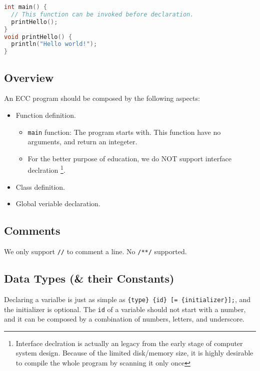 \documentclass{article}
\begin{document}
\begin{lstlisting}[caption=Hello world!\label{code:hw}, language=C]
int main() {
  // This function can be invoked before declaration.
  printHello();
}
void printHello() {
  println("Hello world!");
}
\end{lstlisting}

\subsection{Overview}

An ECC program should be composed by the following aspects:

\begin{itemize}
  \item Function definition.
    \begin{itemize}
      \item \texttt{main} function: The program starts with. This function have no arguments, and return an integeter.
      \item For the better purpose of education, we do NOT support interface declration
	\footnote{Interface declration is actually an legacy from the early stage of computer system design. Because of the
	limited disk/memory size, it is highly desirable to compile the whole program by scanning it only once}.
    \end{itemize}
  \item Class definition.
  \item Global veriable declaration.
\end{itemize}

\subsection{Comments}

We only support \texttt{//} to comment a line. No \texttt{/**/} supported.

\subsection{Data Types (\& their Constants)}
Declaring a varialbe is just as simple as \texttt{\{type\} \{id\} [= \{initializer\}];},
and the initializer is optional. The \texttt{id} of a variable should not start with a
number, and it can be composed by a combination of numbers, letters, and underscore.
\end{document}
